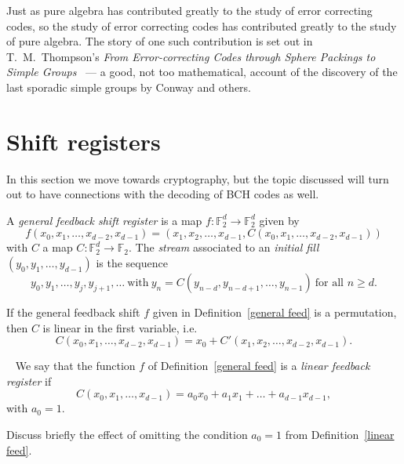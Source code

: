 Just as pure algebra has contributed greatly
to the study of error correcting codes, so
the study of error correcting codes  has contributed
greatly to the study of pure algebra.
The story of one such contribution is set out
in T.~M.~Thompson's
\emph{From Error-correcting Codes through Sphere Packings
to Simple Groups}~\cite{Thompson} --- a good, not too
mathematical, account of
the discovery of the last
sporadic simple groups by Conway and others.
\section{Shift registers}\label{section shift}
In this section we move
towards cryptography, but the topic discussed will
turn out to have connections with the decoding
of BCH codes as well.

\begin{definition}\label{general feed}
A \emph{general feedback shift register} is a map
$f:{\mathbb F}_{2}^{d}\rightarrow {\mathbb F}_{2}^{d}$
given by
\[f(x_{0},x_{1},\dots,x_{d-2},x_{d-1})
=(x_{1},x_{2},\dots,x_{d-1},C(x_{0},x_{1},\dots,x_{d-2},x_{d-1}))\]
with $C$ a map $C:{\mathbb F}_{2}^{d}\rightarrow {\mathbb F}_{2}$.
The \emph{stream} associated to an \emph{initial fill}
$(y_{0},y_{1},\dots,y_{d-1})$ is the sequence
\[y_{0},y_{1},\dots,y_{j},y_{j+1},\dots
\ \text{with}\ y_{n}=C(y_{n-d},y_{n-d+1},\dots,y_{n-1})
\ \text{for all $n\geq d$.}\]
\end{definition}

\begin{example} If the general feedback shift $f$
given in Definition~\ref{general feed} is a permutation,
then $C$ is linear in the first variable, i.e.
\[C(x_{0},x_{1},\dots,x_{d-2},x_{d-1})
=x_{0}+C'(x_{1},x_{2},\dots,x_{d-2},x_{d-1}).\]
\end{example}
\begin{definition}~\label{linear feed}
We say that the function $f$
of Definition~\ref{general feed} is
a \emph{linear feedback register} if
\[C(x_{0},x_{1},\dots,x_{d-1})=
a_{0}x_{0}+a_{1}x_{1}+\ldots+a_{d-1}x_{d-1},\]
with $a_{0}=1$.
\end{definition}
\begin{exercise} Discuss briefly the effect
of omitting the condition
$a_{0}=1$ from Definition~\ref{linear feed}.
\end{exercise}

